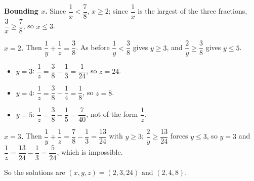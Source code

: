 \textbf{Bounding $x$.} Since $\dfrac{1}{x}<\dfrac{7}{8}$, $x\ge2$; since $\dfrac{1}{x}$ is the largest of the three fractions, $\dfrac{3}{x}\ge\dfrac{7}{8}$, so $x\le3$.

\textbf{$x=2$.} Then $\dfrac{1}{y}+\dfrac{1}{z}=\dfrac{3}{8}$. As before $\dfrac{1}{y}<\dfrac{3}{8}$ gives $y\ge3$, and $\dfrac{2}{y}\ge\dfrac{3}{8}$ gives $y\le5$.
\begin{itemize}
\item $y=3$: $\dfrac{1}{z}=\dfrac{3}{8}-\dfrac{1}{3}=\dfrac{1}{24}$, so $z=24$.
\item $y=4$: $\dfrac{1}{z}=\dfrac{3}{8}-\dfrac{1}{4}=\dfrac{1}{8}$, so $z=8$.
\item $y=5$: $\dfrac{1}{z}=\dfrac{3}{8}-\dfrac{1}{5}=\dfrac{7}{40}$, not of the form $\dfrac{1}{z}$.
\end{itemize}

\textbf{$x=3$.} Then $\dfrac{1}{y}+\dfrac{1}{z}=\dfrac{7}{8}-\dfrac{1}{3}=\dfrac{13}{24}$ with $y\ge3$; $\dfrac{2}{y}\ge\dfrac{13}{24}$ forces $y\le3$, so $y=3$ and $\dfrac{1}{z}=\dfrac{13}{24}-\dfrac{1}{3}=\dfrac{5}{24}$, which is impossible.

So the solutions are $\boxed{(x,y,z)=(2,3,24)\text{ and }(2,4,8)}$.
